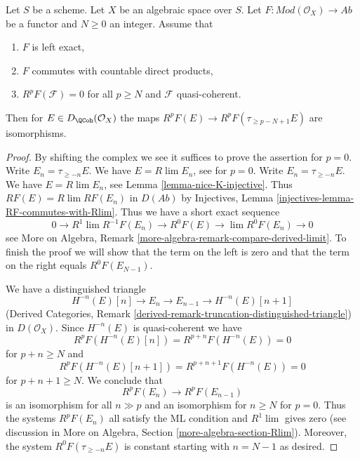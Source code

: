 \begin{lemma}
\label{lemma-application-nice-K-injective}
Let $S$ be a scheme. Let $X$ be an algebraic space over $S$.
Let $F : \textit{Mod}(\mathcal{O}_X) \to \textit{Ab}$
be a functor and $N \geq 0$ an integer. Assume that
\begin{enumerate}
\item $F$ is left exact,
\item $F$ commutes with countable direct products,
\item $R^pF(\mathcal{F}) = 0$ for all $p \geq N$ and $\mathcal{F}$
quasi-coherent.
\end{enumerate}
Then for $E \in D_\QCoh(\mathcal{O}_X)$ the maps
$R^pF(E) \to R^pF(\tau_{\geq p - N + 1}E)$ are isomorphisms.
\end{lemma}

\begin{proof}
By shifting the complex we see it suffices to prove the assertion for $p = 0$.
Write $E_n = \tau_{\geq -n}E$. We have $E = R\lim E_n$, see
for $p = 0$. Write $E_n = \tau_{\geq -n}E$. We have $E = R\lim E_n$, see
Lemma \ref{lemma-nice-K-injective}. Thus
$RF(E) = R\lim RF(E_n)$ in $D(\textit{Ab})$ by Injectives, Lemma
\ref{injectives-lemma-RF-commutes-with-Rlim}. Thus we have a short
exact sequence
$$
0 \to R^1\lim R^{-1}F(E_n) \to R^0F(E) \to \lim R^0F(E_n) \to 0
$$
see More on Algebra, Remark
\ref{more-algebra-remark-compare-derived-limit}.
To finish the proof we will show that the term on the left is zero
and that the term on the right equals $R^0F(E_{N - 1})$.

\medskip\noindent
We have a distinguished triangle
$$
H^{-n}(E)[n] \to E_n \to E_{n - 1} \to H^{-n}(E)[n + 1]
$$
(Derived Categories, Remark
\ref{derived-remark-truncation-distinguished-triangle})
in $D(\mathcal{O}_X)$. Since $H^{-n}(E)$ is quasi-coherent we have
$$
R^pF(H^{-n}(E)[n]) = R^{p + n}F(H^{-n}(E)) = 0
$$
for $p + n \geq N$ and
$$
R^pF(H^{-n}(E)[n + 1]) = R^{p + n + 1}F(H^{-n}(E)) = 0
$$
for $p + n + 1 \geq N$. We conclude that
$$
R^pF(E_n) \to R^pF(E_{n - 1})
$$
is an isomorphism for all $n \gg p$ and an isomorphism for
$n \geq N$ for $p = 0$. Thus the systems $R^pF(E_n)$ all
satisfy the ML condition and $R^1\lim$ gives zero (see discussion
in More on Algebra, Section \ref{more-algebra-section-Rlim}).
Moreover, the system $R^0F(\tau_{\geq - n}E)$ is constant starting
with $n = N - 1$ as desired.
\end{proof}










